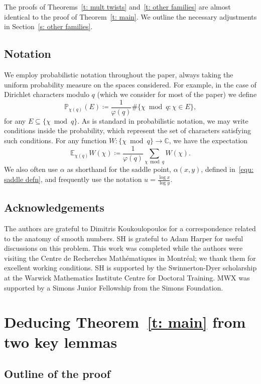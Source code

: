 \documentclass[a4paper,12pt,reqno]{amsart}
\newcommand{\E}{\mathbb{E}}
\newcommand{\p}{\mathbb{P}}
\newcommand{\C}{\mathbb{C}}
\begin{document}
The proofs of Theorems~\ref{t: mult twists} and~\ref{t: other families} are almost identical to the proof of Theorem~\ref{t: main}. We outline the necessary adjustments in Section~\ref{s: other families}.

\subsection{Notation}

We employ probabilistic notation throughout the paper, always taking the uniform probability measure on the spaces considered. For example, in the case of Dirichlet characters modulo $q$ (which we consider for most of the paper) we define
\[
\p_{\chi (q)} (E) \coloneqq \frac{1}{\varphi(q)} \# \bigl\{ \chi \bmod q : \chi \in E \bigr\},
\]
for any $E \subseteq \{ \chi \bmod q \}$. As is standard in probabilistic notation, we may write conditions inside the probability, which represent the set of characters satisfying such conditions. For any function $W \colon \{ \chi \bmod q \} \rightarrow \C$, we have the expectation
\[
\E_{\chi (q)} W(\chi) \coloneqq \frac{1}{\varphi(q)} \sum_{\chi \bmod q} W(\chi).
\]
We also often use $\alpha$ as shorthand for the saddle point, $\alpha (x,y)$, defined in~\eqref{equ: saddle defn}, and frequently use the notation $u = \frac{\log x}{\log y}$.

\subsection*{Acknowledgements} 
The authors are grateful to Dimitris Koukoulopoulos for a correspondence related to the anatomy of smooth numbers. SH is grateful to Adam Harper for useful discussions on this problem. This work was completed while the authors were visiting the Centre de Recherches Mathématiques in Montréal; we thank them for excellent working conditions. SH is supported by the Swinnerton-Dyer scholarship at the Warwick Mathematics Institute Centre for Doctoral Training. MWX was supported by a Simons Junior Fellowship from the Simons Foundation.

\section{Deducing Theorem~\ref{t: main} from two key lemmas}

\subsection{Outline of the proof}\label{s: outline}
\end{document}
